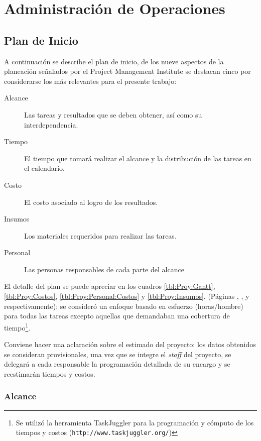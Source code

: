 \chapter{Administración de Operaciones}
\label{ch:AdministracionOperaciones}

\section{Plan de Inicio}
\label{sec:Plan:Inicio}

A continuación se describe el plan de inicio, de los nueve aspectos de la planeación señalados por el Project Management Institute \citep{PMBOK2008} se destacan cinco por considerarse los más relevantes para el presente trabajo:

\begin{description}
	\item [Alcance]  Las tareas y resultados que se deben obtener, así como su interdependencia.
	\item [Tiempo]   El tiempo que tomará realizar el alcance y la distribución de las tareas en el calendario.
	\item [Costo]    El costo asociado al logro de los resultados.
	\item [Insumos]  Los materiales requeridos para realizar las tareas.
	\item [Personal] Las personas responsables de cada parte del alcance
\end{description}

El detalle del plan se puede apreciar en los cuadros \ref{tbl:Proy:Gantt}, \ref{tbl:Proy:Costos}, \ref{tbl:Proy:Personal:Costos} y \ref{tbl:Proy:Insumos}. (Páginas \pageref{tbl:Proy:Gantt}, \pageref{tbl:Proy:Costos}, \pageref{tbl:Proy:Personal:Costos} y \pageref{tbl:Proy:Insumos} respectivamente); se consideró un enfoque basado en esfuerzo (horas/hombre) para todas las tareas excepto aquellas que demandaban una cobertura de tiempo\footnote{Se utilizó la herramienta TaskJuggler para la programación y cómputo de los tiempos y costos (\texttt{http://www.taskjuggler.org/})}.

Conviene hacer una aclaración sobre el estimado del proyecto: los datos obtenidos se consideran provisionales, una vez que se integre el \emph{staff} del proyecto, se delegará a cada responsable la programación detallada de su encargo y se reestimarán tiempos y costos.\label{sec:Proy:Aclaracion}

\subsection{Alcance}

